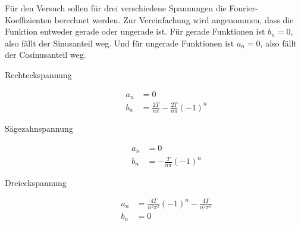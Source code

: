 Für den Versuch sollen für drei verschiedene Spannungen die Fourier-Koeffizienten berechnet werden.
Zur Vereinfachung wird angenommen, dass die Funktion entweder gerade oder ungerade ist.
Für gerade Funktionen ist $b_n = 0$, also fällt der Sinusanteil weg.
Und für ungerade Funktionen ist $a_n = 0$, also fällt der Cosinusanteil weg.
\begin{description}
  \item[Rechteckspannung]
  \begin{align*}
    a_n &= 0 \\
    b_n &= \frac{2T}{n\pi} - \frac{2T}{n\pi}(-1)^n
  \end{align*}
  \item[Sägezahnspannung]
  \begin{align*}
    a_n &= 0 \\
    b_n &= -\frac{T}{n\pi}(-1)^n
  \end{align*}
  \item[Dreieckspannung]
  \begin{align*}
    a_n &= \frac{4T}{n^2\pi^2}(-1)^n - \frac{4T}{n^2\pi^2} \\
    b_n &= 0
  \end{align*}
\end{description}
